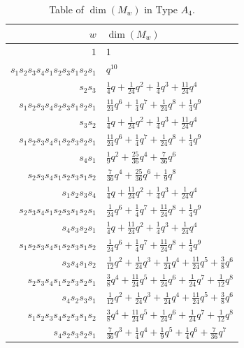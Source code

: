 \documentclass{amsart}
\theoremstyle{definition}
\begin{document}
\begin{table}[p]\caption{Table of $\dim(M_w)$ in Type $A_4$.\label{tab:dimtable}}
{\renewcommand{\arraystretch}{1.5}
\begin{tabular}{|r|l|}
\hline
    $w$ & $\dim(M_w)$\\
    \hline
    \hline
    $1$ & $1$\\
    $s_1s_2s_3s_4s_1s_2s_3s_1s_2s_1$ & $q^{10}$\\
    \hline
    $s_2s_3$ & $\frac{1}{4}q + \frac{1}{24}q^2 + \frac{1}{4}q^3 + \frac{11}{24}q^4$\\
    $s_1s_2s_3s_4s_2s_3s_1s_2s_1$ & $\frac{11}{24}q^6 + \frac{1}{4}q^7 + \frac{1}{24}q^8 + \frac{1}{4}q^9$\\
    \hline
    $s_3s_2$ & $\frac{1}{4}q + \frac{1}{24}q^2 + \frac{1}{4}q^3 + \frac{11}{24}q^4$ \\
    $s_1s_2s_3s_4s_1s_2s_3s_2s_1$ & $\frac{11}{24}q^6 + \frac{1}{4}q^7 + \frac{1}{24}q^8 + \frac{1}{4}q^9$\\
    \hline
    $s_4s_1$ & $\frac{1}{9}q^2 + \frac{25}{36}q^4 + \frac{7}{36}q^6$ \\
    $s_2s_3s_4s_1s_2s_3s_1s_2$ & $\frac{7}{36}q^4 + \frac{25}{36}q^6 + \frac{1}{9}q^8$ \\
    \hline
    $s_1s_2s_3s_4$ & $\frac{1}{4}q + \frac{11}{24}q^2 + \frac{1}{4}q^3 + \frac{1}{24}q^4$ \\
    $s_2s_3s_4s_1s_2s_3s_1s_2s_1$ & $\frac{1}{24}q^6 + \frac{1}{4}q^7 + \frac{11}{24}q^8 + \frac{1}{4}q^9$\\
    \hline
    $s_4s_3s_2s_1$ & $\frac{1}{4}q + \frac{11}{24}q^2 + \frac{1}{4}q^3 + \frac{1}{24}q^4$ \\
    $s_1s_2s_3s_4s_1s_2s_3s_1s_2$ & $\frac{1}{24}q^6 + \frac{1}{4}q^7 + \frac{11}{24}q^8 + \frac{1}{4}q^9$\\
    \hline
    $s_3s_4s_1s_2$ & $\frac{1}{12}q^2 + \frac{1}{24}q^3 + \frac{1}{24}q^4 + \frac{11}{24}q^5 + \frac{3}{8}q^6$ \\
    $s_2s_3s_4s_1s_2s_3s_2s_1$ & $\frac{3}{8}q^4 + \frac{11}{24}q^5 + \frac{1}{24}q^6 + \frac{1}{24}q^7 + \frac{1}{12}q^8$\\
    \hline
    $s_4s_2s_3s_1$ & $\frac{1}{12}q^2 + \frac{1}{24}q^3 + \frac{1}{24}q^4 + \frac{11}{24}q^5 + \frac{3}{8}q^6$ \\
    $s_1s_2s_3s_4s_2s_3s_1s_2$ & $\frac{3}{8}q^4 + \frac{11}{24}q^5 + \frac{1}{24}q^6 + \frac{1}{24}q^7 + \frac{1}{12}q^8$\\
    \hline
    $s_4s_2s_3s_2s_1$ & $\frac{7}{36}q^3 + \frac{1}{4}q^4 + \frac{1}{9}q^5 + \frac{1}{4}q^6 + \frac{7}{36}q^7$ \\

\end{tabular}}
\end{table}
\end{document}
